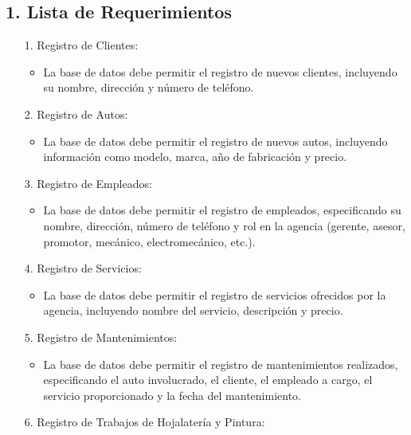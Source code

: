 \documentclass[12pt]{article}
\begin{document}
    \subsection*{1. Lista de Requerimientos}
        \begin{itemize}
            \item[1.] Registro de Clientes:
                \begin{itemize}
                    \item La base de datos debe permitir el registro de nuevos clientes, incluyendo su nombre, dirección y número de teléfono.
                \end{itemize}
            \item[2.] Registro de Autos:
                \begin{itemize}
                    \item La base de datos debe permitir el registro de nuevos autos, incluyendo información como modelo, marca, año de fabricación y precio.
                \end{itemize}
            \item[3.] Registro de Empleados:
                \begin{itemize}
                    \item La base de datos debe permitir el registro de empleados, especificando su nombre, dirección, número de teléfono y rol en la agencia (gerente, asesor, promotor, mecánico, electromecánico, etc.).
                \end{itemize}
            \item[4.] Registro de Servicios:
                \begin{itemize}
                    \item La base de datos debe permitir el registro de servicios ofrecidos por la agencia, incluyendo nombre del servicio, descripción y precio.
                \end{itemize}
            \item[5.] Registro de Mantenimientos:
                \begin{itemize}
                    \item La base de datos debe permitir el registro de mantenimientos realizados, especificando el auto involucrado, el cliente, el empleado a cargo, el servicio proporcionado y la fecha del mantenimiento.
                \end{itemize}
            \item[6.] Registro de Trabajos de Hojalatería y Pintura:

\end{itemize}
\end{document}
